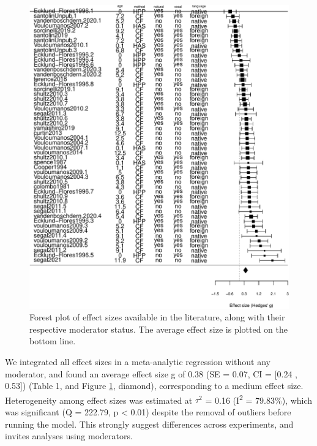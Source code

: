 \documentclass[
  english,
  man]{apa6}
\begin{document}
\begin{figure}
\centering
\includegraphics{MA_speech_pref_files/figure-latex/forest-1.pdf}
\caption{\label{fig:forest}Forest plot of effect sizes available in the literature, along with their respective moderator status. The average effect size is plotted on the bottom line.}
\end{figure}

We integrated all effect sizes in a meta-analytic regression without any moderator, and found an average effect size g of 0.38 (SE = 0.07, CI = {[}0.24 , 0.53{]}) (Table 1, and Figure \ref{fig:forest}, diamond), corresponding to a medium effect size.
Heterogeneity among effect sizes was estimated at \(\tau^2\) = 0.16 (I\textsuperscript{2} = 79.83\%), which was significant (Q = 222.79, p \textless{} 0.01) despite the removal of outliers before running the model. This strongly suggest differences across experiments, and invites analyses using moderators.
\end{document}
